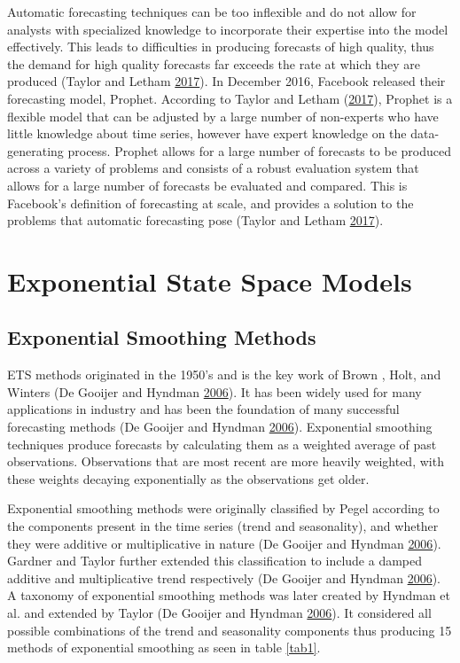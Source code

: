 \documentclass[12pt,preprint, authoryear]{elsarticle}
\numberwithin{equation}{section}
\numberwithin{figure}{section}
\numberwithin{table}{section}
\begin{document}
Automatic forecasting techniques can be too inflexible and do not allow
for analysts with specialized knowledge to incorporate their expertise
into the model effectively. This leads to difficulties in producing
forecasts of high quality, thus the demand for high quality forecasts
far exceeds the rate at which they are produced (Taylor and Letham
\protect\hyperlink{ref-taylor2017forecasting}{2017}). In December 2016,
Facebook released their forecasting model, Prophet. According to Taylor
and Letham (\protect\hyperlink{ref-taylor2017forecasting}{2017}),
Prophet is a flexible model that can be adjusted by a large number of
non-experts who have little knowledge about time series, however have
expert knowledge on the data-generating process. Prophet allows for a
large number of forecasts to be produced across a variety of problems
and consists of a robust evaluation system that allows for a large
number of forecasts be evaluated and compared. This is Facebook's
definition of forecasting at scale, and provides a solution to the
problems that automatic forecasting pose (Taylor and Letham
\protect\hyperlink{ref-taylor2017forecasting}{2017}).

\section{\texorpdfstring{Exponential State Space Models
\label{Exponential State Space Models}}{Exponential State Space Models }}\label{exponential-state-space-models}

\subsection{Exponential Smoothing
Methods}\label{exponential-smoothing-methods}

ETS methods originated in the 1950's and is the key work of Brown ,
Holt, and Winters (De Gooijer and Hyndman
\protect\hyperlink{ref-de200625}{2006}). It has been widely used for
many applications in industry and has been the foundation of many
successful forecasting methods (De Gooijer and Hyndman
\protect\hyperlink{ref-de200625}{2006}). Exponential smoothing
techniques produce forecasts by calculating them as a weighted average
of past observations. Observations that are most recent are more heavily
weighted, with these weights decaying exponentially as the observations
get older.

Exponential smoothing methods were originally classified by Pegel
according to the components present in the time series (trend and
seasonality), and whether they were additive or multiplicative in nature
(De Gooijer and Hyndman \protect\hyperlink{ref-de200625}{2006}). Gardner
and Taylor further extended this classification to include a damped
additive and multiplicative trend respectively (De Gooijer and Hyndman
\protect\hyperlink{ref-de200625}{2006}). A taxonomy of exponential
smoothing methods was later created by Hyndman et al. and extended by
Taylor (De Gooijer and Hyndman \protect\hyperlink{ref-de200625}{2006}).
It considered all possible combinations of the trend and seasonality
components thus producing 15 methods of exponential smoothing as seen in
table \ref{tab1}.
\end{document}
